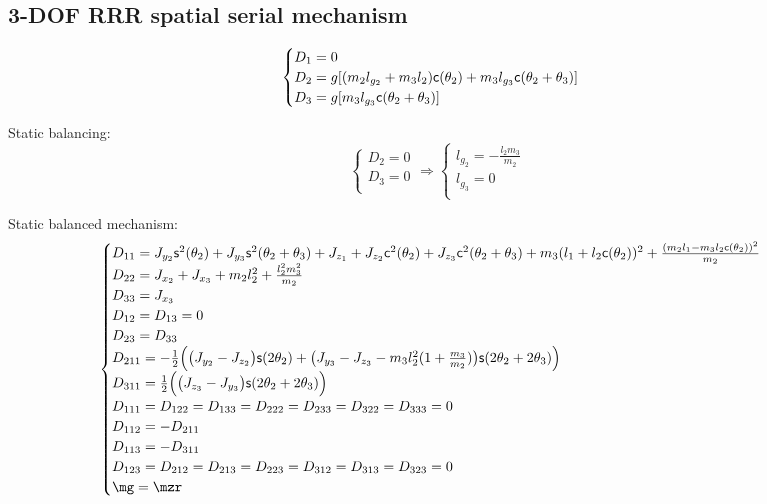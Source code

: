\documentclass[a4paper,11pt,brazil,fleqn]{article}
\begin{document}
\subsection{3-DOF RRR spatial serial mechanism} \label{S03-2}

\begin{equation}
\begin{cases}
D_1 = 0 \\
D_2 = g[ (m_2 l_{g_2} + m_3 l_2  ) \mathsf{c}(\theta_2) + m_3 l_{g_3} \mathsf{c}(\theta_2 + \theta_3) ]  \\
D_3 = g[ m_3 l_{g_3} \mathsf{c}(\theta_2 + \theta_3)  ] \\
\end{cases}
\end{equation} 

Static balancing:
\begin{equation}
\begin{cases}
D_2 = 0 \\
D_3 = 0 \\
\end{cases}
\Rightarrow
\begin{cases}
l_{g_2} = -\frac{l_2 m_3}{m_2} \\
l_{g_3} = 0 \\
\end{cases}
\end{equation}

Static balanced mechanism:
\begin{equation}
\begin{cases}
D_{11} = J_{y_2}\ssin^2(\theta_2) + J_{y_3}\ssin^2(\theta_2+\theta_3) + J_{z_1} + J_{z_2}\ccos^2(\theta_2) + J_{z_3}\ccos^2(\theta_2+\theta_3) + m_3 (l_1 + l_2 \ccos(\theta_2))^2 + \frac{(m_2 l_1 - m_3 l_2 \ccos(\theta_2))^2}{m_2} \\
D_{22} = J_{x_2} + J_{x_3} + m_2 l_2^2 + \frac{l_2^2 m_3^2}{m_2} \\
D_{33} = J_{x_3} \\
D_{12} = D_{13} = 0 \\
D_{23} = D_{33} \\
D_{211} = -\frac{1}{2} \Big( \big( J_{y_2} - J_{z_2} \big) \ssin(2\theta_2) + \big(J_{y_3} - J_{z_3} - m_3 l_2^2 ( 1 + \frac{m_3}{m_2} )\big)\ssin(2\theta_2+2\theta_3)    \Big) \\
D_{311} = \frac{1}{2} \Big( \big(J_{z_3} - J_{y_3} \big)\ssin(2\theta_2+2\theta_3) \Big) \\
D_{111} = D_{122} = D_{133} = D_{222} = D_{233} = D_{322} = D_{333} = 0 \\
D_{112} = - D_{211} \\
D_{113} = - D_{311} \\
D_{123} = D_{212} = D_{213} = D_{223} = D_{312} = D_{313} = D_{323} = 0 \\
\mg = \mzr
\end{cases}
\end{equation}
\end{document}
